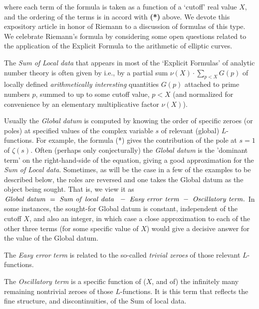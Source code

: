 \documentclass[11pt]{article}
\theoremstyle{plain}
\theoremstyle{definition}
\numberwithin{equation}{section}
\numberwithin{figure}{section}
\numberwithin{table}{section}
\begin{document}
 \noindent where each  term of the formula  is taken as a function of a `cutoff' real value $X$, and the ordering of the terms is in accord with {\bf(*)} above. We devote this expository  article in honor of Riemann to a discussion of formulas of this type. We celebrate Riemann's formula  by considering some open questions related to the application of the Explicit Formula to the arithmetic of elliptic curves.

  The {\it Sum of Local data} that appears in most of the `Explicit Formulas' of analytic number theory is often given by  i.e., by a partial sum $\nu(X)\cdot\sum_{p<X}G(p)$ of locally defined {\it arithmetically interesting} quantities $G(p)$ attached to prime numbers $p$, summed to up to some cutoff value, $p<X$  (and normalized for convenience by an elementary multiplicative factor $\nu(X)$).

   Usually the {\it Global datum} is computed by knowing the order of specific zeroes (or poles) at specified values of the complex variable $s$  of relevant (global) $L$-functions.  For example, the formula {(*)} gives the contribution of the pole at $s=1$ of $\zeta(s)$.  Often (perhaps only conjecturally)  the  {\it Global datum} is the 'dominant term'    on the right-hand-side of the equation, giving a good approximation for the {\it Sum of Local data}. Sometimes, as will be the case in a few of the examples to be described below, the roles are reversed and one takes the Global datum as the object being sought.  That is, we view it as ${\rm{\it Global\ datum}}\ = \  {\rm{\it Sum\ of\ local\ data\  }}\ -\  {\rm{\it  Easy\ error\ term}}\ -\  {\rm{\it  Oscillatory\ term}}.$  In some instances, the sought-for Global datum is constant, independent of the cutoff $X$, and also an integer, in which case a close approximation to each of the other three terms (for some specific value of $X$) would give a decisive answer for the value of the Global datum.


 The {\it Easy error term}  is related to the so-called {\it trivial zeroes} of those relevant $L$-functions.

 The {\it Oscillatory term} is  a specific function of ($X$, and of) the infinitely many remaining nontrivial zeroes of those $L$-functions. It is this term that reflects the fine structure, and discontinuities, of the Sum of local data.
\end{document}
